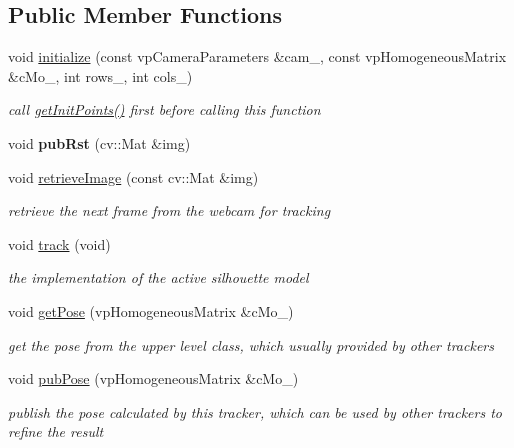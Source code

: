 \subsection*{\-Public \-Member \-Functions}
\begin{DoxyCompactItemize}
\item 
void \hyperlink{classactiveModelTracker_a1fbe7c429519357f167e2a6daba9c1b2}{initialize} (const vp\-Camera\-Parameters \&cam\-\_\-, const vp\-Homogeneous\-Matrix \&c\-Mo\-\_\-, int rows\-\_\-, int cols\-\_\-)
\begin{DoxyCompactList}\small\item\em call \hyperlink{classcadModel_ae3d972106caa18f05da2296f38cd13ef}{get\-Init\-Points()} first before calling this function \end{DoxyCompactList}\item 
\hypertarget{classactiveModelTracker_a9bb0ecb86cdbd766e4283e0f36003a98}{void {\bfseries pub\-Rst} (cv\-::\-Mat \&img)}\label{classactiveModelTracker_a9bb0ecb86cdbd766e4283e0f36003a98}

\item 
void \hyperlink{classactiveModelTracker_a3c76176c8d5e3c8975700190096e078a}{retrieve\-Image} (const cv\-::\-Mat \&img)
\begin{DoxyCompactList}\small\item\em retrieve the next frame from the webcam for tracking \end{DoxyCompactList}\item 
\hypertarget{classactiveModelTracker_a3b5bb03a296c77053bf3b3cf46b919ef}{void \hyperlink{classactiveModelTracker_a3b5bb03a296c77053bf3b3cf46b919ef}{track} (void)}\label{classactiveModelTracker_a3b5bb03a296c77053bf3b3cf46b919ef}

\begin{DoxyCompactList}\small\item\em the implementation of the active silhouette model \end{DoxyCompactList}\item 
void \hyperlink{classactiveModelTracker_abb6139d33e79dbea945d01456917c44d}{get\-Pose} (vp\-Homogeneous\-Matrix \&c\-Mo\-\_\-)
\begin{DoxyCompactList}\small\item\em get the pose from the upper level class, which usually provided by other trackers \end{DoxyCompactList}\item 
void \hyperlink{classactiveModelTracker_a815de9481b9aab09c9c42fa9fed6d1a4}{pub\-Pose} (vp\-Homogeneous\-Matrix \&c\-Mo\-\_\-)
\begin{DoxyCompactList}\small\item\em publish the pose calculated by this tracker, which can be used by other trackers to refine the result \end{DoxyCompactList}\end{DoxyCompactItemize}
